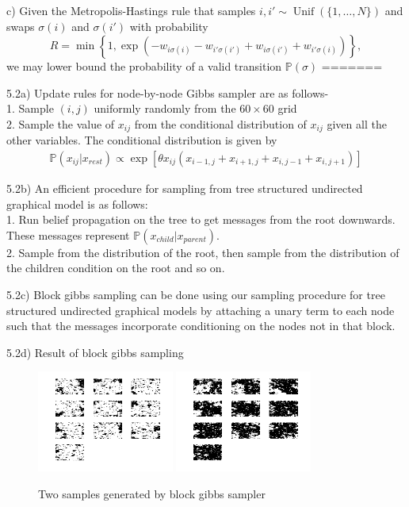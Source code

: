 \documentclass[10pt,onecolumn,letterpaper]{article}
\begin{document}
c) Given the Metropolis-Hastings rule that samples $i,i'\sim\operatorname{Unif}(\{1,\dotsc, N\})$ and swaps $\sigma(i)$ and $\sigma(i')$ with probability
\begin{equation*}
 R = \min\left\{1, \exp(-w_{i\sigma(i)}-w_{i'\sigma(i')}+w_{i\sigma(i')}+w_{i'\sigma(i)}) \right\},
\end{equation*}
we may lower bound the probability of a valid transition $\mathbb{P}(\sigma)$
=======

\pagebreak
5.2a) Update rules for node-by-node Gibbs sampler are as follows- \\
1. Sample $(i,j)$ uniformly randomly from the $60\times 60$ grid \\
2. Sample the value of $x_{ij}$ from the conditional distribution of $x_{ij}$ given all the other variables. The conditional distribution is given by
\begin{align*}
\mathbb{P}(x_{ij}|x_{rest}) \propto \exp \left[ \theta x_{ij}\left(x_{i-1,j} + x_{i+1,j} + x_{i,j-1} + x_{i,j+1}\right) \right]
\end{align*}

5.2b) An efficient procedure for sampling from tree structured undirected graphical model is as follows: \\
1. Run belief propagation on the tree to get messages from the root downwards. These messages represent $\mathbb{P}(x_{child}|x_{parent})$. \\
2. Sample from the distribution of the root, then sample from the distribution of the children condition on the root and so on.

5.2c) Block gibbs sampling can be done using our sampling procedure for tree structured undirected graphical models by attaching a unary term to each node such that the messages incorporate conditioning on the nodes not in that block.

5.2d) Result of block gibbs sampling
\begin{figure}[htbp]
  \centering
    \includegraphics[width=0.4\textwidth]{Images/block_1.png}
    \hfill
	\includegraphics[width=0.4\textwidth]{Images/block_3.png}
    \caption{Two samples generated by block gibbs sampler} 
\end{figure}
\end{document}
